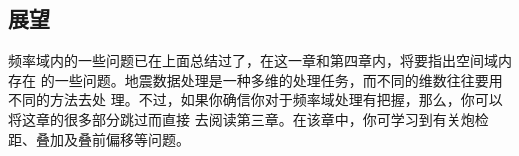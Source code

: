 \subsection{展望}
频率域内的一些问题已在上面总结过了，在这一章和第四章内，将要指出空间域内存在
的一些问题。地震数据处理是一种多维的处理任务，而不同的维数往往要用不同的方法去处
理。不过，如果你确信你对于频率域处理有把握，那么，你可以将这章的很多部分跳过而直接
去阅读第三章。在该章中，你可学习到有关炮检距、叠加及叠前偏移等问题。


